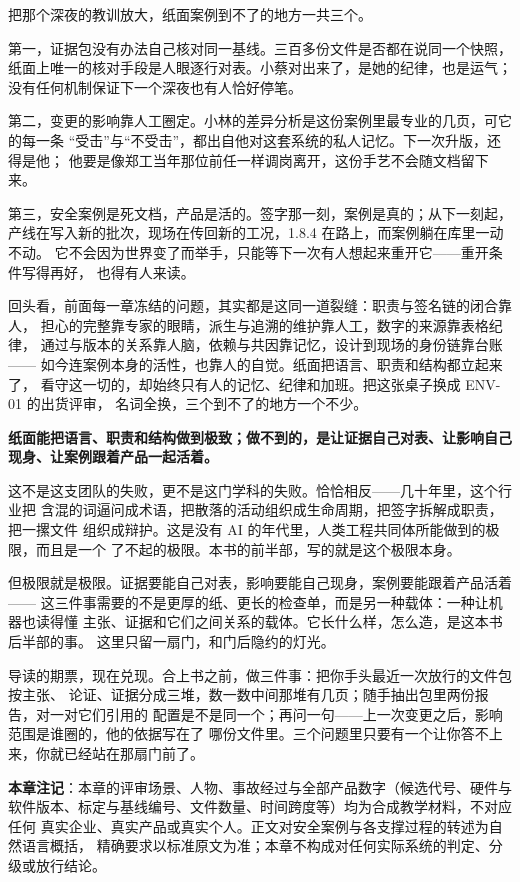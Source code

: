 把那个深夜的教训放大，纸面案例到不了的地方一共三个。

第一，证据包没有办法自己核对同一基线。三百多份文件是否都在说同一个快照，
纸面上唯一的核对手段是人眼逐行对表。小蔡对出来了，是她的纪律，也是运气；
没有任何机制保证下一个深夜也有人恰好停笔。

第二，变更的影响靠人工圈定。小林的差异分析是这份案例里最专业的几页，可它的每一条
“受击”与“不受击”，都出自他对这套系统的私人记忆。下一次升版，还得是他；
他要是像郑工当年那位前任一样调岗离开，这份手艺不会随文档留下来。

第三，安全案例是死文档，产品是活的。签字那一刻，案例是真的；从下一刻起，
产线在写入新的批次，现场在传回新的工况，1.8.4 在路上，而案例躺在库里一动不动。
它不会因为世界变了而举手，只能等下一次有人想起来重开它——重开条件写得再好，
也得有人来读。

回头看，前面每一章冻结的问题，其实都是这同一道裂缝：职责与签名链的闭合靠人，
担心的完整靠专家的眼睛，派生与追溯的维护靠人工，数字的来源靠表格纪律，
通过与版本的关系靠人脑，依赖与共因靠记忆，设计到现场的身份链靠台账——
如今连案例本身的活性，也靠人的自觉。纸面把语言、职责和结构都立起来了，
看守这一切的，却始终只有人的记忆、纪律和加班。把这张桌子换成 ENV-01 的出货评审，
名词全换，三个到不了的地方一个不少。

\textbf{纸面能把语言、职责和结构做到极致；做不到的，是让证据自己对表、让影响自己现身、让案例跟着产品一起活着。}

这不是这支团队的失败，更不是这门学科的失败。恰恰相反——几十年里，这个行业把
含混的词逼问成术语，把散落的活动组织成生命周期，把签字拆解成职责，把一摞文件
组织成辩护。这是没有 AI 的年代里，人类工程共同体所能做到的极限，而且是一个
了不起的极限。本书的前半部，写的就是这个极限本身。

但极限就是极限。证据要能自己对表，影响要能自己现身，案例要能跟着产品活着——
这三件事需要的不是更厚的纸、更长的检查单，而是另一种载体：一种让机器也读得懂
主张、证据和它们之间关系的载体。它长什么样，怎么造，是这本书后半部的事。
这里只留一扇门，和门后隐约的灯光。

导读的期票，现在兑现。合上书之前，做三件事：把你手头最近一次放行的文件包按主张、
论证、证据分成三堆，数一数中间那堆有几页；随手抽出包里两份报告，对一对它们引用的
配置是不是同一个；再问一句——上一次变更之后，影响范围是谁圈的，他的依据写在了
哪份文件里。三个问题里只要有一个让你答不上来，你就已经站在那扇门前了。


\begin{noteblock}
\textbf{本章注记}：本章的评审场景、人物、事故经过与全部产品数字（候选代号、硬件与
软件版本、标定与基线编号、文件数量、时间跨度等）均为合成教学材料，不对应任何
真实企业、真实产品或真实个人。正文对安全案例与各支撑过程的转述为自然语言概括，
精确要求以标准原文为准；本章不构成对任何实际系统的判定、分级或放行结论。
\end{noteblock}
